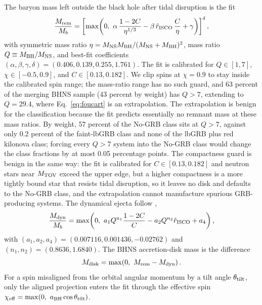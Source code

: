 \documentclass[twocolumn,apj]{openjournal}
\newcommand{\Mtov}{M_{\rm TOV}}
\newcommand{\Mdisk}{M_{\rm disk}}
\newcommand{\aBH}{a_{\rm BH}}
\begin{document}
The baryon mass left outside the black hole after tidal disruption is the
\citet[their Eq.~4]{foucart2018} fit
\begin{equation}
\frac{M_{\rm rem}}{M_b} = \left[\max\!\left(0,\ \alpha\,\frac{1-2C}{\eta^{1/3}}
- \beta\,\hat{r}_{\rm ISCO}\,\frac{C}{\eta} + \gamma\right)\right]^{\delta},
\label{eq:foucart}
\end{equation}
with symmetric mass ratio $\eta = M_{\rm NS} M_{\rm BH}/(M_{\rm NS}+M_{\rm BH})^2$,
mass ratio $Q \equiv M_{\rm BH}/M_{\rm NS}$, and best-fit coefficients
$(\alpha,\beta,\gamma,\delta) = (0.406, 0.139, 0.255, 1.761)$. The fit is
calibrated for $Q \in [1, 7]$, $\chi \in [-0.5, 0.9]$, and $C \in [0.13, 0.182]$.
We clip spins at $\chi = 0.9$ to stay inside the calibrated spin range; the
mass-ratio range has no such guard, and 63 percent of the merging BHNS sample
(43 percent by weight) has $Q > 7$, extending to $Q = 29.4$, where
Eq.~\ref{eq:foucart} is an extrapolation. The extrapolation is benign for the
classification because the fit predicts essentially no remnant mass at these
mass ratios. By weight, 57 percent of the No-GRB class sits at $Q > 7$,
against only 0.2 percent of the faint-lbGRB class and none of the lbGRB plus
red kilonova class; forcing every $Q > 7$ system into the No-GRB class would
change the class fractions by at most 0.05 percentage points. The compactness
guard is benign in the same way: the fit is calibrated for $C \in [0.13, 0.182]$
and neutron stars near $\Mtov$ exceed the upper edge, but a higher compactness
is a more tightly bound star that resists tidal disruption, so it leaves no disk
and defaults to the No-GRB class, and the extrapolation cannot manufacture
spurious GRB-producing systems.
The dynamical ejecta follow \citet[their Eq.~9]{kruger2020},
\begin{equation}
\frac{M_{\rm dyn}}{M_b} = \max\!\left(0,\ a_1 Q^{n_1}\frac{1-2C}{C}
- a_2 Q^{n_2}\hat{r}_{\rm ISCO} + a_4\right),
\label{eq:kfdyn}
\end{equation}
with $(a_1, a_2, a_4) = (0.007116, 0.001436, -0.02762)$ and
$(n_1, n_2) = (0.8636, 1.6840)$. The BHNS accretion-disk mass is the difference
\begin{equation}
\Mdisk = \max\!\left(0,\ M_{\rm rem} - M_{\rm dyn}\right).
\label{eq:disk}
\end{equation}
For a spin misaligned from the orbital angular momentum by a tilt angle
$\theta_{\rm tilt}$, only the aligned projection enters the fit through the
effective spin $\chi_{\rm eff} = \max(0,\ \aBH\cos\theta_{\rm tilt})$.
\end{document}
